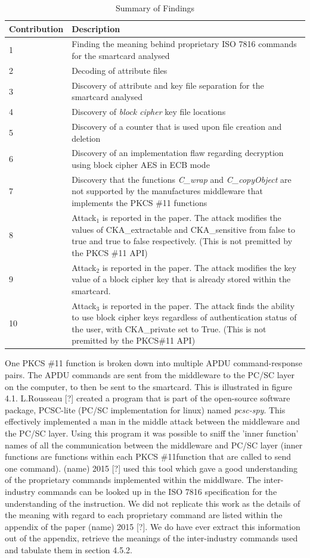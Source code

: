 \documentclass[bsc,frontabs,twoside,singlespacing,parskip,deptreport]{infthesis}     %
\begin{document}
\begin{table}[H]
\begin{tabular}{|l|p{10cm}|}
\hline
Contribution & Description\\
\hline
1 & Finding the meaning behind proprietary ISO 7816 commands for the smartcard analysed\\
\hline
2 & Decoding of attribute files\\
\hline
3 & Discovery of attribute and key file separation for the smartcard analysed\\
\hline
4 &Discovery of \textit{block cipher} key file locations\\
\hline
5 & Discovery of a counter that is used upon file creation and deletion\\
\hline
6 & Discovery of an implementation flaw regarding decryption using block cipher AES in ECB mode\\
\hline
7 & Discovery that the functions \textit{C\_wrap} and \textit{C\_copyObject} are not supported by the manufactures middleware that implements the PKCS \#11 functions\\
\hline
8 & Attack$_1$ is reported in the paper. The attack modifies the values of CKA\_extractable and CKA\_sensitive from false to true and true to false respectively. (This is not premitted by the PKCS \#11 API)\\
\hline
9 & Attack$_2$ is reported in the paper. The attack modifies the key value of a block cipher key that is already stored within the smartcard.\\
\hline
10 & Attack$_3$ is reported in the paper. The attack finds the ability to use block cipher keys regardless of authentication status of the user, with CKA\_private set to True. (This is not premitted by the PKCS\#11 API)\\
\hline
\end{tabular}
\caption{Summary of Findings}
\end{table}

One PKCS \#11 function is broken down into multiple APDU command-response pairs. The APDU commands are sent from the middleware to the PC/SC layer on the computer, to then be sent to the smartcard. This is illustrated in figure 4.1. L.Rousseau [?] created a program that is part of the open-source software package,  PCSC-lite (PC/SC implementation for linux) named \textit{pcsc-spy}. This effectively implemented a man in the middle attack between the middleware and the PC/SC layer. Using this program it was possible to sniff the 'inner function' names of all the communication between the middleware and PC/SC layer (inner functions are functions within each PKCS \#11function that are called to send one command). (name) 2015 [?] used this tool which gave a good understanding of the proprietary commands implemented within the middlware. The inter-industry commands can be looked up in the ISO 7816 specification for the understanding of the instruction. We did not replicate this work as the details of the meaning with regard to each proprietary command are listed within the appendix of the paper (name) 2015 [?]. We do have ever extract this information out of the appendix, retrieve the meanings of the inter-industry commands used and tabulate them in section 4.5.2.
\end{document}
